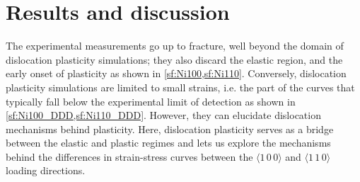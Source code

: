 \section{Results and discussion}
\label{s:NiResults}

The experimental measurements go up to fracture, well beyond the domain of dislocation plasticity simulations; they also discard the elastic region, and the early onset of plasticity as shown in \cref{sf:Ni100,sf:Ni110}. Conversely, dislocation plasticity simulations are limited to small strains, i.e. the part of the curves that typically fall below the experimental limit of detection as shown in \cref{sf:Ni100_DDD,sf:Ni110_DDD}. However, they can elucidate dislocation mechanisms behind plasticity. Here, dislocation plasticity serves as a bridge between the elastic and plastic regimes and lets us explore the mechanisms behind the differences in strain-stress curves between the $\langle 1\,0\,0 \rangle$ and $\langle 1\,1\,0 \rangle$ loading directions.

